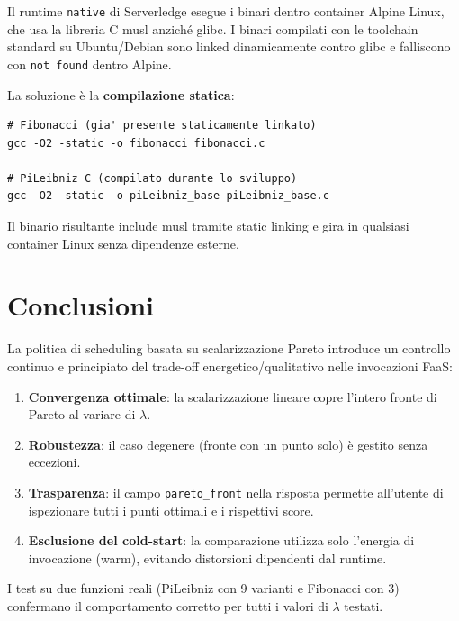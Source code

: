 \documentclass[a4paper,12pt]{article}
\begin{document}
Il runtime \texttt{native} di Serverledge esegue i binari dentro
container Alpine Linux, che usa la libreria C musl anziché glibc.
I binari compilati con le toolchain standard su Ubuntu/Debian sono
linked dinamicamente contro glibc e falliscono con
\texttt{not found} dentro Alpine.

La soluzione è la \textbf{compilazione statica}:

\begin{lstlisting}[style=bash]
# Fibonacci (gia' presente staticamente linkato)
gcc -O2 -static -o fibonacci fibonacci.c

# PiLeibniz C (compilato durante lo sviluppo)
gcc -O2 -static -o piLeibniz_base piLeibniz_base.c
\end{lstlisting}

Il binario risultante include musl tramite static linking e gira
in qualsiasi container Linux senza dipendenze esterne.

\section{Conclusioni}

La politica di scheduling basata su scalarizzazione Pareto introduce
un controllo continuo e principiato del trade-off energetico/qualitativo
nelle invocazioni FaaS:

\begin{enumerate}
  \item \textbf{Convergenza ottimale}: la scalarizzazione lineare
        copre l'intero fronte di Pareto al variare di $\lambda$.
  \item \textbf{Robustezza}: il caso degenere (fronte con un punto solo)
        è gestito senza eccezioni.
  \item \textbf{Trasparenza}: il campo \texttt{pareto\_front} nella
        risposta permette all'utente di ispezionare tutti i punti
        ottimali e i rispettivi score.
  \item \textbf{Esclusione del cold-start}: la comparazione utilizza
        solo l'energia di invocazione (warm), evitando distorsioni
        dipendenti dal runtime.
\end{enumerate}

I test su due funzioni reali (PiLeibniz con 9 varianti e Fibonacci con
3) confermano il comportamento corretto per tutti i valori di $\lambda$
testati.
\end{document}
